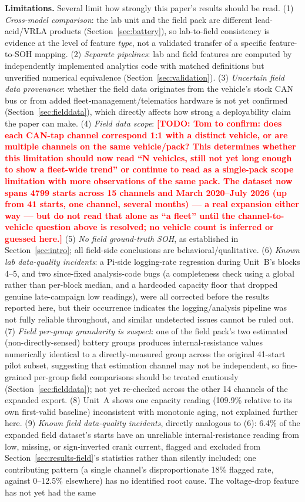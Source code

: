 \documentclass[conference]{IEEEtran}
\newcommand{\todo}[1]{\textcolor{red}{\textbf{[TODO: #1]}}}
\begin{document}
\textbf{Limitations.} Several limit how strongly this paper's results should be read. (1) \emph{Cross-model comparison}: the lab unit and the field pack are different lead-acid/VRLA products (Section~\ref{sec:battery}), so lab-to-field consistency is evidence at the level of feature \emph{type}, not a validated transfer of a specific feature-to-SOH mapping. (2) \emph{Separate pipelines}: lab and field features are computed by independently implemented analytics code with matched definitions but unverified numerical equivalence (Section~\ref{sec:validation}). (3) \emph{Uncertain field data provenance}: whether the field data originates from the vehicle's stock CAN bus or from added fleet-management/telematics hardware is not yet confirmed (Section~\ref{sec:fielddata}), which directly affects how strong a deployability claim the paper can make. (4) \emph{Field data scope}: \todo{Tom to confirm: does each CAN-tap channel correspond 1:1 with a distinct vehicle, or are multiple channels on the same vehicle/pack? This determines whether this limitation should now read ``N vehicles, still not yet long enough to show a fleet-wide trend'' or continue to read as a single-pack scope limitation with more observations of the same pack. The dataset now spans 4799 starts across 15 channels and March 2020--July 2026 (up from 41 starts, one channel, several months) --- a real expansion either way --- but do not read that alone as ``a fleet'' until the channel-to-vehicle question above is resolved; no vehicle count is inferred or guessed here.} (5) \emph{No field ground-truth SOH}, as established in Section~\ref{sec:intro}; all field-side conclusions are behavioral/qualitative. (6) \emph{Known lab data-quality incidents}: a Pi-side logging-rate regression during Unit~B's blocks 4--5, and two since-fixed analysis-code bugs (a completeness check using a global rather than per-block median, and a hardcoded capacity floor that dropped genuine late-campaign low readings), were all corrected before the results reported here, but their occurrence indicates the logging/analysis pipeline was not fully reliable throughout, and similar undetected issues cannot be ruled out. (7) \emph{Field per-group granularity is suspect}: one of the field pack's two estimated (non-directly-sensed) battery groups produces internal-resistance values numerically identical to a directly-measured group across the original 41-start pilot subset, suggesting that estimation channel may not be independent, so fine-grained per-group field comparisons should be treated cautiously (Section~\ref{sec:fielddata}); not yet re-checked across the other 14 channels of the expanded export. (8) Unit~A shows one capacity reading (109.9\% relative to its own first-valid baseline) inconsistent with monotonic aging, not explained further here. (9) \emph{Known field data-quality incidents}, directly analogous to (6): 6.4\% of the expanded field dataset's starts have an unreliable internal-resistance reading from low, missing, or sign-inverted crank current, flagged and excluded from Section~\ref{sec:results-field}'s statistics rather than silently included; one contributing pattern (a single channel's disproportionate 18\% flagged rate, against 0--12.5\% elsewhere) has no identified root cause. The voltage-drop feature has not yet had the same 
\end{document}
